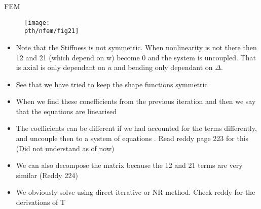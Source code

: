 	\begin{frame}{FEM}
		\begin{figure}
			\centering
			\texttt{[image: \\pth/nfem/fig21]} 		
		\end{figure}
	\end{frame}


	\begin{frame}
		\begin{itemize}
			\item Note that the Stiffness is not symmetric. When nonlinearity is not there then 12 and 21 (which depend on w) become 0 and the system is uncoupled. That is axial is only dependant on $u$ and bending only dependant on $\Delta$.
			\item See that we have tried to keep the shape functions symmetric
			\item When we find these conefficients from the previous iteration and then we say that the equations are linearised
			\item  The coefficients can be different if we had accounted for the terms differently, and uncouple then to a system of equations . Read reddy page 223 for this (Did not understand as of now)
			\item  We can also decompose the matrix because the 12 and 21 terms are very similar (Reddy 224)
			\item We obviously solve using direct iterative or NR method. Check reddy for the derivations of T 
		\end{itemize}
	\end{frame}


